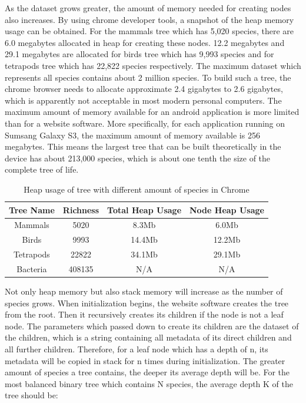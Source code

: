\documentclass[a4paper,11pt,twoside]{report}
\begin{document}
As the dataset grows greater, the amount of memory needed for creating nodes also increases. By using chrome developer tools,  a snapshot of the heap memory usage can be obtained. For the mammals tree which has 5,020 species, there are 6.0 megabytes allocated in heap for creating these nodes. 12.2 megabytes and 29.1 megabytes are allocated for birds tree which has 9,993 species and for tetrapods tree which has 22,822 species respectively. The maximum dataset which represents all species contains about 2 million species. To build such a tree, the chrome browser needs to allocate approximate 2.4 gigabytes to 2.6 gigabytes, which is apparently not acceptable in most modern personal computers. The maximum amount of memory available for an android application is more limited than for a website software. More specifically, for each application running on Sumsang Galaxy S3, the maximum amount of memory available is 256 megabytes. This means the largest tree that can be built theoretically in the device has about 213,000 species, which is about one tenth the size of the complete tree of life.
\begin{table} [H]
	\centering %
	\begin{tabular}{|c c c c|} %
		\hline %
		Tree Name & Richness  &  Total Heap Usage & Node Heap Usage\\%
		\hline  %
		Mammals & 5020 &  8.3Mb & 6.0Mb\\  %
		\hline
		Birds & 9993 &  14.4Mb & 12.2Mb\\
		\hline
		Tetrapods & 22822 & 34.1Mb & 29.1Mb\\ 
		\hline %
		Bacteria & 408135 & N/A & N/A \\ [1ex] %
		\hline
	\end{tabular}
	\label{table:nonlin} %
	\caption{Heap usage of tree with different amount of species in Chrome} %
\end{table}


Not only heap memory but also stack memory will increase as the number of species grows. When initialization begins, the website software creates the tree from the root. Then it recursively creates its children if the node is not a leaf node. The parameters which passed down to create its children are the dataset of the children, which is a string containing all metadata of its direct children and all further children. Therefore, for a leaf node which has a depth of n, its metadata will be copied in stack for n times during initialization. The greater amount of species a tree contains, the deeper its average depth will be. For the most balanced binary tree which contains N species, the average depth K of the tree should be:
\end{document}
